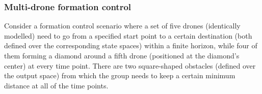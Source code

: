 \subsubsection{Multi-drone formation control}
\label{subsec:formation_control}
Consider a formation control scenario where a set of five drones (identically modelled) need to go from a specified start point to a certain destination (both defined over the corresponding state spaces) within a finite horizon, while four of them forming a diamond around a fifth drone (positioned at the diamond's center) at every time point. There are two square-shaped obstacles (defined over the output space) from which the group needs to keep a certain minimum distance at all of the time points. %

